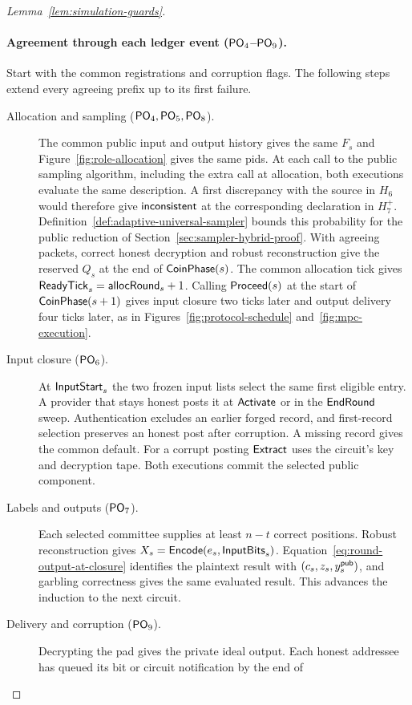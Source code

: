 \begin{proof}[Lemma~\ref{lem:simulation-guards}]
\paragraph{Agreement through each ledger event ($\mathsf{PO}_{4}$--$\mathsf{PO}_{9}$).}
Start with the common registrations and corruption flags.  The following
steps extend every agreeing prefix up to its first failure.
\begin{description}
 \item[Allocation and sampling ($\mathsf{PO}_{4},\mathsf{PO}_{5},\mathsf{PO}_{8}$).]
 The common public input and output history gives the same $F_s$ and
 Figure~\ref{fig:role-allocation} gives the same pids.  At each call to the public sampling algorithm,
 including the extra call at allocation, both executions
 evaluate the same description.  A first discrepancy with the source
 in $H_6$ would therefore give $\mathsf{inconsistent}$ at the corresponding
 declaration in $H_7^+$.  Definition~\ref{def:adaptive-universal-sampler}
 bounds this probability for the public reduction of
 Section~\ref{sec:sampler-hybrid-proof}.  With agreeing packets,
 correct honest decryption and robust reconstruction give the reserved
 $Q_s$ at the end of $\mathsf{CoinPhase}(s)$.
 The common allocation tick gives $\mathsf{ReadyTick}_s=\mathsf{allocRound}_s+1$.
 Calling $\mathsf{Proceed}(s)$ at the start of $\mathsf{CoinPhase}(s+1)$ gives input
 closure two ticks later and output delivery four ticks later, as in
 Figures~\ref{fig:protocol-schedule} and~\ref{fig:mpc-execution}.
 \item[Input closure ($\mathsf{PO}_{6}$).]
 At $\mathsf{InputStart}_s$ the two frozen input lists select the same first
 eligible entry.  A provider that stays honest posts it at $\mathsf{Activate}$
 or in the $\mathsf{EndRound}$ sweep.  Authentication excludes an earlier
 forged record, and first-record selection preserves an honest post
 after corruption.  A missing record gives the common
 default.  For a corrupt posting $\mathsf{Extract}$ uses the circuit's key and
 decryption tape.  Both executions commit the selected public component.
 \item[Labels and outputs ($\mathsf{PO}_{7}$).]
 Each selected committee supplies at least $n-t$ correct positions.
 Robust reconstruction gives $X_s=\mathsf{Encode}(e_s,\mathsf{InputBits}_s)$.
 Equation~\eqref{eq:round-output-at-closure} identifies the plaintext
 result with $(c_s,z_s,y^{\mathsf{pub}}_s)$, and garbling correctness gives the same
 evaluated result.  This advances the induction to the next circuit.
 \item[Delivery and corruption ($\mathsf{PO}_{9}$).]
 Decrypting the pad gives the private ideal output.  Each honest
 addressee has queued its bit or circuit notification by the end of

\end{description}
\end{proof}
